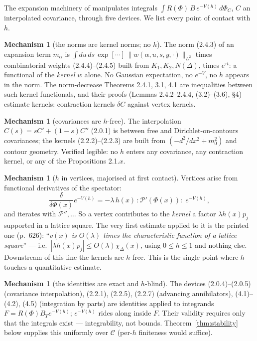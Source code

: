 \documentclass[11pt,a4paper]{article}
\theoremstyle{plain}
\theoremstyle{definition}
\newtheorem{mechanism}[theorem]{Mechanism}
\begin{document}
The expansion machinery of \cite[\S\S2--4]{GJS} manipulates integrals
$\int R(\Phi)\,B\,e^{-V(h)}\,d\Phi_{C}$, $C$ an interpolated covariance, through five devices. We
list every point of contact with $h$.

\begin{mechanism}[the norms are kernel norms; no $h$]\label{m:norm}
The norm (2.4.3) of an expansion term $m_\alpha$ is
$\int du\,ds\,\exp[\cdots]\,\|w(\alpha,u,s,y,\cdot)\|_{L^2}$ times combinatorial weights
(2.4.4)--(2.4.5) built from $K_1,K_2,N(\Delta)$, times $e^{\tau t}$: a functional of the
\emph{kernel} $w$ alone. No Gaussian expectation, no $e^{-V}$, no $h$ appears in the norm. The
norm-decrease Theorems 2.4.1, 3.1, 4.1 are inequalities between such kernel functionals, and
their proofs (Lemmas 2.4.2--2.4.4, (3.2)--(3.6), \S4) estimate kernels: contraction kernels
$\delta C$ against vertex kernels.
\end{mechanism}

\begin{mechanism}[covariances are $h$-free]\label{m:cov}
The interpolation $C(s)=sC'+(1-s)C''$ (2.0.1) is between free and Dirichlet-on-contours
covariances; the kernels (2.2.2)--(2.2.3) are built from $(-d^2/dx^2+m_0^2)$ and contour
geometry. Verified legible: no $h$ enters any covariance, any contraction kernel, or any of the
Propositions 2.1.$x$.
\end{mechanism}

\begin{mechanism}[$h$ in vertices, majorised at first contact]\label{m:vertex}
Vertices arise from functional derivatives of the spectator:
\[
  \frac{\delta}{\delta\Phi(x)}e^{-V(h)}
  =-\lambda\,h(x)\,{:}\mathscr P'(\Phi(x)){:}\;e^{-V(h)},
\]
and iterates with $\mathscr P'',\dots$ So a vertex contributes to the \emph{kernel} a factor
$\lambda h(x)p_j$ supported in a lattice square. The very first estimate applied to it is the
printed one (p.~626): ``\emph{$v(x)$ is $O(\lambda)$ times the characteristic function of a
lattice square}'' --- i.e.\ $|\lambda h(x)p_j|\le O(\lambda)\chi_\Delta(x)$, using $0\le h\le1$
and nothing else. Downstream of this line the kernels are $h$-free. This is the single point
where $h$ touches a quantitative estimate.
\end{mechanism}

\begin{mechanism}[the identities are exact and $h$-blind]\label{m:ident}
The devices (2.0.4)--(2.0.5) (covariance interpolation), (2.2.1), (2.2.5), (2.2.7) (advancing
annihilators), (4.1)--(4.2), (4.5) (integration by parts) are identities applied to integrands
$F=R(\Phi)B_Te^{-V(h)}$; $e^{-V(h)}$ rides along inside $F$. Their validity requires only that
the integrals exist --- integrability, not bounds. Theorem~\ref{thm:stability} below supplies
this uniformly over $\mathcal C$ (per-$h$ finiteness would suffice).
\end{mechanism}
\end{document}
